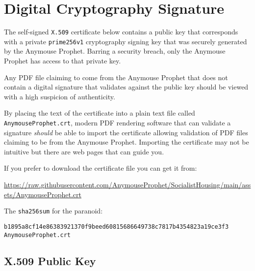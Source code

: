 \cleardoublepage %
\section*{Digital Cryptography Signature}


The self-signed \texttt{X.509} certificate below contains a public key that corresponds with a private \texttt{prime256v1} cryptography signing key that was securely generated by the Anymouse Prophet. Barring a security breach, only the Anymouse Prophet has access to that private key.

Any PDF file claiming to come from the Anymouse Prophet that does not contain a digital signature that validates against the public key should be viewed with a high suspicion of authenticity.

By placing the text of the certificate into a plain text file called \texttt{AnymouseProphet.crt}, modern PDF rendering software that can validate a signature \emph{should} be able to import the certificate allowing validation of PDF files claiming to be from the Anymouse Prophet. Importing the certificate may not be intuitive but there are web pages that can guide you.

If you prefer to download the certificate file you can get it from:

\bigskip

\url{https://raw.githubusercontent.com/AnymouseProphet/SocialistHousing/main/assets/AnymouseProphet.crt}

\bigskip

The \texttt{sha256sum} for the paranoid:

\makeatletter
\newcommand{\verbatimfont}[1]{\renewcommand{\verbatim@font}{\ttfamily#1}}
\makeatother

\verbatimfont{\footnotesize}%
\begin{verbatim}
b1895a8cf14e86383921370f9beed60815686649738c7817b4354823a19ce3f3  AnymouseProphet.crt
\end{verbatim}

\subsection*{X.509 Public Key}

\bigskip

